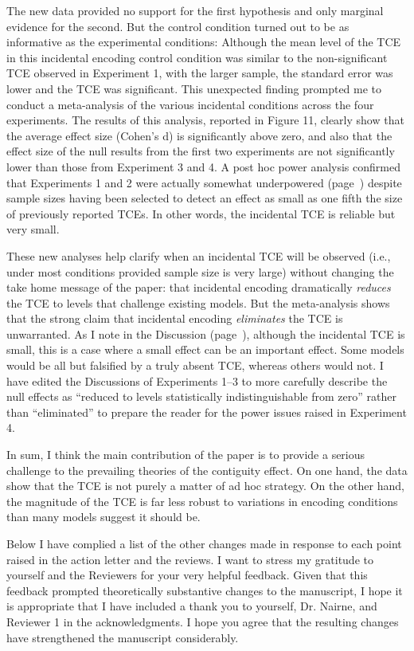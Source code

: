 \documentclass[12pt]{article}
\begin{document}
The new data provided no support for the first hypothesis and only marginal evidence for the second. But the control condition turned out to be as informative as the experimental conditions: Although the mean level of the TCE in this incidental encoding control condition was similar to the non-significant TCE observed in Experiment 1, with the larger sample, the standard error was lower and the TCE was significant. This unexpected finding prompted me to conduct a meta-analysis of the various incidental conditions across the four experiments. The results of this analysis, reported in Figure 11, clearly show that the average effect size (Cohen's d) is significantly above zero, and also that the effect size of the null results from the first two experiments are not significantly lower than those from Experiment 3 and 4. A post hoc power analysis confirmed that Experiments 1 and 2 were actually somewhat underpowered (page~\pageref{power}) despite sample sizes having been selected to detect an effect as small as one fifth the size of previously reported TCEs. In other words, the incidental TCE is reliable but very small.

These new analyses help clarify when an incidental TCE will be observed (i.e., under most conditions provided sample size is very large) without changing the take home message of the paper: that incidental encoding dramatically \emph{reduces} the TCE to levels that challenge existing models. But the meta-analysis shows that the strong claim that incidental encoding \emph{eliminates} the TCE is unwarranted. As I note in the Discussion (page~\pageref{zerovsnear}), although the incidental TCE is small, this is a case where a small effect can be an important effect. Some models would be all but falsified by a truly absent TCE, whereas others would not. I have edited the Discussions of Experiments 1--3 to more carefully describe the null effects as ``reduced to levels statistically indistinguishable from zero'' rather than ``eliminated'' to prepare the reader for the power issues raised in Experiment 4.

In sum, I think the main contribution of the paper is to provide a serious challenge to the prevailing theories of the contiguity effect. On one hand, the data show that the TCE is not purely a matter of ad hoc strategy. On the other hand, the magnitude of the TCE is far less robust to variations in encoding conditions than many models suggest it should be. 

Below I have complied a list of the other changes made in response to each point raised in the action letter and the reviews. I want to stress my gratitude to yourself and the Reviewers for your very helpful feedback. Given that this feedback prompted theoretically substantive changes to the manuscript, I hope it is appropriate that I have included a thank you to yourself, Dr. Nairne, and Reviewer 1 in the acknowledgments. I hope you agree that the resulting changes have strengthened the manuscript considerably.
\end{document}
